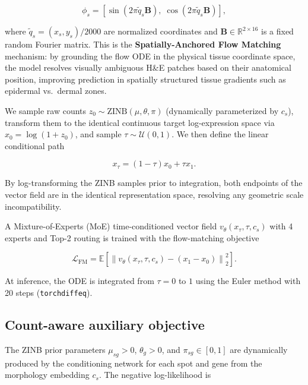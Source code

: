 \documentclass[nocrop]{bioinfo}
\begin{document}
\begin{equation}
\phi_s = \left[\sin(2\pi \tilde{q}_s \mathbf{B}),\; \cos(2\pi \tilde{q}_s \mathbf{B})\right],
\end{equation}

where $\tilde{q}_s = (x_s, y_s) / 2000$ are normalized coordinates and $\mathbf{B} \in \mathbb{R}^{2 \times 16}$
is a fixed random Fourier matrix. This is the \textbf{Spatially-Anchored Flow Matching} mechanism:
by grounding the flow ODE in the physical tissue coordinate space, the model resolves
visually ambiguous H\&E patches based on their anatomical position, improving prediction
in spatially structured tissue gradients such as epidermal vs.\ dermal zones.

We sample raw counts $z_0 \sim \text{ZINB}(\mu, \theta, \pi)$ (dynamically parameterized by $c_s$), transform them to the identical continuous target log-expression space via $x_0 = \log(1+z_0)$, and sample $\tau\sim\mathcal{U}(0,1)$. We then define the linear conditional path

\begin{equation}
x_{\tau}=(1-\tau)x_0+\tau x_1.
\end{equation}

By log-transforming the ZINB samples prior to integration, both endpoints of the vector field are in the identical representation space, resolving any geometric scale incompatibility.

A Mixture-of-Experts (MoE) time-conditioned vector field
$v_{\theta}(x_{\tau},\tau,c_s)$ with 4 experts and Top-2 routing is trained with the flow-matching objective

\begin{equation}
\mathcal{L}_{\mathrm{FM}}=
\mathbb{E}\left[
\left\|
v_{\theta}(x_{\tau},\tau,c_s)-(x_1-x_0)
\right\|_2^2
\right].
\end{equation}

At inference, the ODE is integrated from $\tau=0$ to $1$ using the Euler method with 20 steps (\texttt{torchdiffeq}).

\subsection{Count-aware auxiliary objective}

The ZINB prior parameters $\mu_{sg}>0$, $\theta_g>0$, and
$\pi_{sg}\in[0,1]$ are dynamically produced by the conditioning network for each
spot and gene from the morphology embedding $c_s$. The negative log-likelihood is
\end{document}
